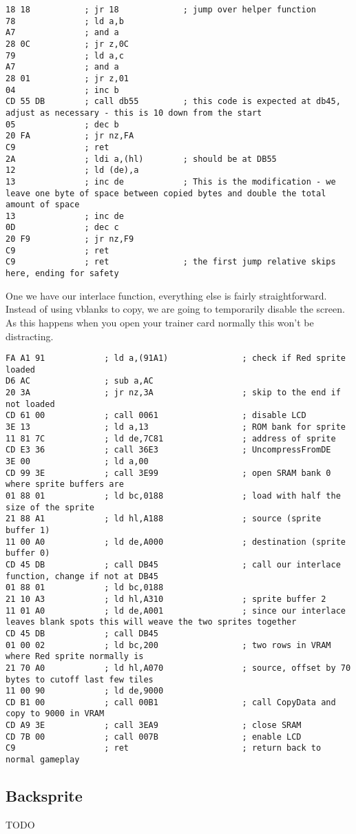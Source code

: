 \documentclass[../main.tex]{subfiles}
\begin{document}
    \begin{verbatim}
18 18           ; jr 18             ; jump over helper function
78              ; ld a,b
A7              ; and a
28 0C           ; jr z,0C
79              ; ld a,c
A7              ; and a
28 01           ; jr z,01
04              ; inc b
CD 55 DB        ; call db55         ; this code is expected at db45, adjust as necessary - this is 10 down from the start
05              ; dec b
20 FA           ; jr nz,FA
C9              ; ret
2A              ; ldi a,(hl)        ; should be at DB55
12              ; ld (de),a
13              ; inc de            ; This is the modification - we leave one byte of space between copied bytes and double the total amount of space
13              ; inc de
0D              ; dec c
20 F9           ; jr nz,F9
C9              ; ret
C9              ; ret               ; the first jump relative skips here, ending for safety
    \end{verbatim}

    One we have our interlace function, everything else is fairly straightforward.  Instead of using vblanks to copy, we are going to temporarily disable the screen.  As this happens when you open your trainer card normally this won't be distracting.

    \begin{verbatim}
FA A1 91            ; ld a,(91A1)               ; check if Red sprite loaded
D6 AC               ; sub a,AC
20 3A               ; jr nz,3A                  ; skip to the end if not loaded
CD 61 00            ; call 0061                 ; disable LCD
3E 13               ; ld a,13                   ; ROM bank for sprite
11 81 7C            ; ld de,7C81                ; address of sprite
CD E3 36            ; call 36E3                 ; UncompressFromDE
3E 00               ; ld a,00
CD 99 3E            ; call 3E99                 ; open SRAM bank 0 where sprite buffers are
01 88 01            ; ld bc,0188                ; load with half the size of the sprite
21 88 A1            ; ld hl,A188                ; source (sprite buffer 1)
11 00 A0            ; ld de,A000                ; destination (sprite buffer 0)
CD 45 DB            ; call DB45                 ; call our interlace function, change if not at DB45
01 88 01            ; ld bc,0188
21 10 A3            ; ld hl,A310                ; sprite buffer 2
11 01 A0            ; ld de,A001                ; since our interlace leaves blank spots this will weave the two sprites together
CD 45 DB            ; call DB45
01 00 02            ; ld bc,200                 ; two rows in VRAM where Red sprite normally is
21 70 A0            ; ld hl,A070                ; source, offset by 70 bytes to cutoff last few tiles
11 00 90            ; ld de,9000
CD B1 00            ; call 00B1                 ; call CopyData and copy to 9000 in VRAM
CD A9 3E            ; call 3EA9                 ; close SRAM
CD 7B 00            ; call 007B                 ; enable LCD
C9                  ; ret                       ; return back to normal gameplay
    \end{verbatim}

    \subsection{Backsprite}
    TODO
\end{document}
